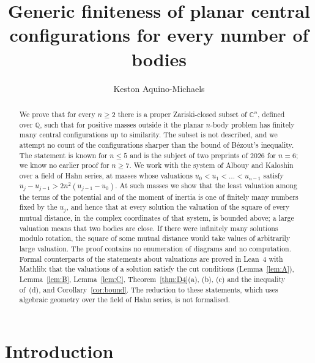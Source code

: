 \documentclass[11pt]{amsart}
\theoremstyle{definition}
\theoremstyle{remark}
\numberwithin{equation}{section}
\newcommand{\QQ}{\mathbb{Q}}
\newcommand{\CC}{\mathbb{C}}
\begin{document}
\title[Generic finiteness of planar central configurations]{Generic finiteness of planar central configurations for every number of bodies}

\author{Keston Aquino-Michaels}
\address{No Way Labs}

\begin{abstract}
We prove that for every $n \ge 2$ there is a proper Zariski-closed subset of $\CC^n$, defined over
$\QQ$, such that for positive masses outside it the planar $n$-body problem has finitely many central
configurations up to similarity. The subset is not described, and we attempt no count of the
configurations sharper than the bound of B\'ezout's inequality. The statement is known for $n \le 5$ and is the subject of two preprints of 2026 for
$n = 6$; we know no earlier proof for $n \ge 7$. We work with the system of Albouy and Kaloshin over a
field of Hahn series, at masses whose valuations $u_0 < u_1 < \dots < u_{n-1}$ satisfy
$u_j - u_{j-1} > 2n^2 (u_{j-1} - u_0)$. At such masses we show that the least valuation among the terms
of the potential and of the moment of inertia is one of finitely many numbers fixed by the $u_j$, and
hence that at every solution the valuation of the square of every mutual distance, in the complex
coordinates of that system, is bounded above; a large valuation means that two bodies are close. If
there were infinitely many solutions modulo rotation, the square of some mutual distance would take
values of arbitrarily large valuation. The proof contains no
enumeration of diagrams and no computation. Formal counterparts of the statements about valuations are
proved in Lean~4 with Mathlib: that the valuations of a solution satisfy the cut conditions
(Lemma~\ref{lem:A}), Lemma~\ref{lem:B}, Lemma~\ref{lem:C}, Theorem~\ref{thm:D4}(a), (b), (c) and the
inequality of~(d), and Corollary~\ref{cor:bound}. The reduction to these statements, which uses algebraic geometry over the
field of Hahn series, is not formalised.
\end{abstract}

\maketitle

\section{Introduction}\label{sec:intro}
\end{document}
